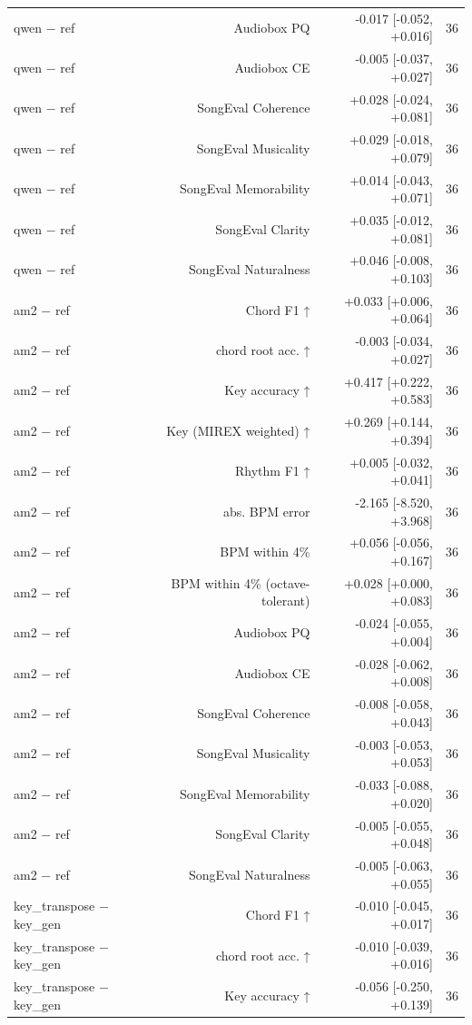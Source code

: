 \begin{table}[t]
\begin{tabular}{lrrr}
qwen $-$ ref & Audiobox PQ & -0.017 [-0.052, +0.016] & 36 \\
qwen $-$ ref & Audiobox CE & -0.005 [-0.037, +0.027] & 36 \\
qwen $-$ ref & SongEval Coherence & +0.028 [-0.024, +0.081] & 36 \\
qwen $-$ ref & SongEval Musicality & +0.029 [-0.018, +0.079] & 36 \\
qwen $-$ ref & SongEval Memorability & +0.014 [-0.043, +0.071] & 36 \\
qwen $-$ ref & SongEval Clarity & +0.035 [-0.012, +0.081] & 36 \\
qwen $-$ ref & SongEval Naturalness & +0.046 [-0.008, +0.103] & 36 \\
am2 $-$ ref & Chord F1 ↑ & +0.033 [+0.006, +0.064] & 36 \\
am2 $-$ ref & chord root acc. ↑ & -0.003 [-0.034, +0.027] & 36 \\
am2 $-$ ref & Key accuracy ↑ & +0.417 [+0.222, +0.583] & 36 \\
am2 $-$ ref & Key (MIREX weighted) ↑ & +0.269 [+0.144, +0.394] & 36 \\
am2 $-$ ref & Rhythm F1 ↑ & +0.005 [-0.032, +0.041] & 36 \\
am2 $-$ ref & abs. BPM error & -2.165 [-8.520, +3.968] & 36 \\
am2 $-$ ref & BPM within 4\% & +0.056 [-0.056, +0.167] & 36 \\
am2 $-$ ref & BPM within 4\% (octave-tolerant) & +0.028 [+0.000, +0.083] & 36 \\
am2 $-$ ref & Audiobox PQ & -0.024 [-0.055, +0.004] & 36 \\
am2 $-$ ref & Audiobox CE & -0.028 [-0.062, +0.008] & 36 \\
am2 $-$ ref & SongEval Coherence & -0.008 [-0.058, +0.043] & 36 \\
am2 $-$ ref & SongEval Musicality & -0.003 [-0.053, +0.053] & 36 \\
am2 $-$ ref & SongEval Memorability & -0.033 [-0.088, +0.020] & 36 \\
am2 $-$ ref & SongEval Clarity & -0.005 [-0.055, +0.048] & 36 \\
am2 $-$ ref & SongEval Naturalness & -0.005 [-0.063, +0.055] & 36 \\
key\_transpose $-$ key\_gen & Chord F1 ↑ & -0.010 [-0.045, +0.017] & 36 \\
key\_transpose $-$ key\_gen & chord root acc. ↑ & -0.010 [-0.039, +0.016] & 36 \\
key\_transpose $-$ key\_gen & Key accuracy ↑ & -0.056 [-0.250, +0.139] & 36 \\

\end{tabular}
\end{table}
